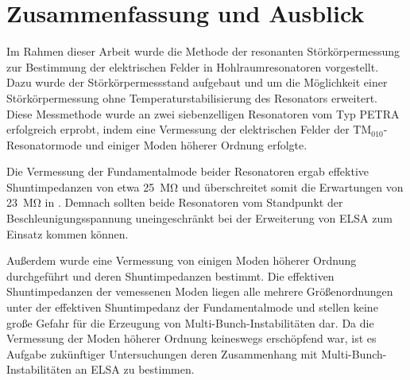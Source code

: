 \chapter{Zusammenfassung und Ausblick}
\label{sec:fazit}
Im Rahmen dieser Arbeit wurde die Methode der resonanten Störkörpermessung zur Bestimmung der elektrischen Felder in Hohlraumresonatoren vorgestellt.
Dazu wurde der Störkörpermessstand aufgebaut und um die Möglichkeit einer Störkörpermessung ohne Temperaturstabilisierung des Resonators erweitert.
Diese Messmethode wurde an zwei siebenzelligen Resonatoren vom Typ PETRA erfolgreich erprobt, indem eine Vermessung der elektrischen Felder der $\mathrm{TM}_{010}$-Resonatormode und einiger Moden höherer Ordnung erfolgte.

Die Vermessung der Fundamentalmode beider Resonatoren ergab effektive Shuntimpedanzen von etwa \SI{25}{\mega\ohm} und überschreitet somit die Erwartungen von \SI{23}{\mega\ohm} in \cite{schedler}.
Demnach sollten beide Resonatoren vom Standpunkt der Beschleunigungsspannung uneingeschränkt bei der Erweiterung von ELSA zum Einsatz kommen können.

Außerdem wurde eine Vermessung von einigen Moden höherer Ordnung durchgeführt und deren Shuntimpedanzen bestimmt.
Die effektiven Shuntimpedanzen der vemessenen Moden liegen alle mehrere Größenordnungen unter der effektiven Shuntimpedanz der Fundamentalmode und stellen keine große Gefahr für die Erzeugung von Multi-Bunch-Instabilitäten dar.
Da die Vermessung der Moden höherer Ordnung keineswegs erschöpfend war, ist es Aufgabe zukünftiger Untersuchungen deren Zusammenhang mit Multi-Bunch-Instabilitäten an ELSA zu bestimmen.
